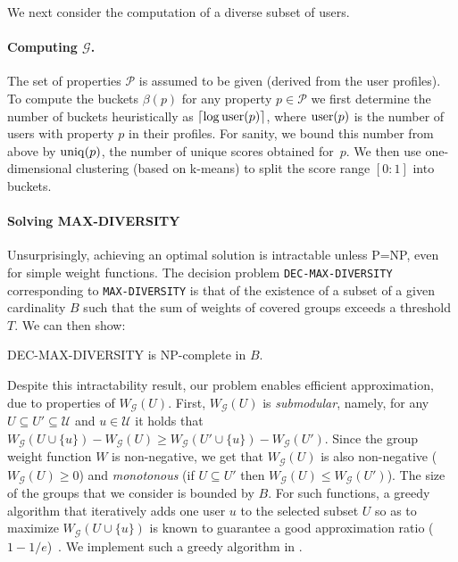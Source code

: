 We next consider the computation of a diverse subset of users. 

\paragraph*{Computing $\mathcal{G}$.} The set of properties $\mathcal{P}$ is assumed to be given (derived from the user profiles). To compute the buckets $\beta(p)$ for any property $p\in\mathcal{P}$ we first determine the number of buckets heuristically as $\lceil\log\operatorname{user}(p)\rceil$, where $\operatorname{user}(p)$ is the number of users with property $p$ in their profiles. For sanity, we bound this number from above by $\operatorname{uniq}(p)$, the number of unique scores obtained for~$p$. We then use one-dimensional clustering (based on k-means) to split the score range $[0:1]$ into buckets.


\paragraph*{Solving MAX-DIVERSITY} Unsurprisingly, achieving an optimal solution is intractable unless P=NP, even for simple weight functions. The decision problem \texttt{DEC-MAX-DIVERSITY} corresponding to \texttt{MAX-DIVERSITY} is that of the existence of a subset of a given cardinality $B$ such that the sum of weights of covered groups exceeds a threshold $T$. We can then show:   

\begin{proposition}
	DEC-MAX-DIVERSITY is NP-complete in $B$.  
\end{proposition}

Despite this intractability result, our problem enables efficient approximation, due to properties of $W_{\mathcal{G}}(U)$. First, $W_{\mathcal{G}}(U)$ is \emph{submodular}, namely, for any $U\subseteq U'\subseteq \mathcal{U}$ and $u\in\mathcal{U}$ it holds that $W_{\mathcal{G}}(U\cup\{u\})-W_{\mathcal{G}}(U)\geq W_{\mathcal{G}}(U'\cup\{u\})-W_{\mathcal{G}}(U')$. Since the group weight function $W$ is non-negative, we get that $W_{\mathcal{G}}(U)$ is also non-negative ($W_{\mathcal{G}}(U)\geq 0$) and \emph{monotonous} (if $U\subseteq U'$ then $W_{\mathcal{G}}(U)\leq W_{\mathcal{G}}(U')$). The size of the groups that we consider is bounded by $B$. For such functions, a greedy algorithm that iteratively adds one user $u$ to the selected subset $U$ so as to maximize $W_{\mathcal{G}}(U\cup\{u\})$ is known to guarantee a good approximation ratio ($1-1/e$)~\cite{nemhauser1978analysis}. We implement such a greedy algorithm in \sysname{}. 



